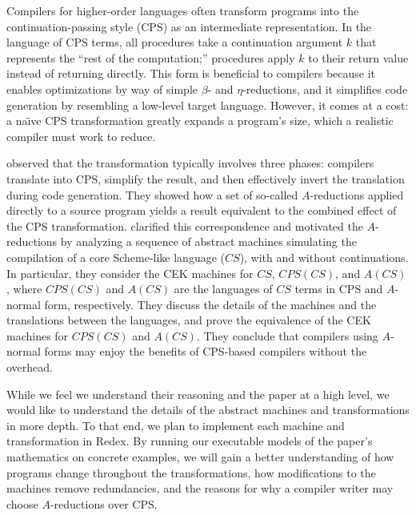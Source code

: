 \documentclass[11pt]{article}
\begin{document}
\thispagestyle{fancy}

Compilers for higher-order languages often transform programs into the
continuation-passing style (CPS) as an intermediate representation. In the
language of CPS terms, all procedures take a continuation argument $k$
that represents the ``rest of the computation;'' procedures apply $k$ to their
return value instead of returning directly. This form is beneficial to
compilers because it enables optimizations by way of simple $\beta$- and
$\eta$-reductions, and it simplifies code generation by resembling a low-level
target language. However, it comes at a cost: a na\"{\i}ve CPS transformation
greatly expands a program's size, which a realistic compiler must work to
reduce.

\citet{Sabry:1992zr} observed that the transformation typically  involves
three phases: compilers translate into CPS, simplify the result, and then
effectively invert the translation during code generation. They showed how
a set of so-called $A$-reductions applied directly to a source program yields a
result equivalent to the combined effect of the CPS transformation.
\citet{Flanagan:1993fk} clarified this correspondence and motivated the
$A$-reductions by analyzing a sequence of abstract machines simulating the
compilation of a core Scheme-like language ($\mathit{CS}$), with and without
continuations. In particular, they consider the CEK machines for $\mathit{CS}$,
$\mathit{CPS}(\mathit{CS})$, and $A(\mathit{CS})$,  where
$\mathit{CPS}(\mathit{CS})$ and $A(\mathit{CS})$ are the languages of
$\mathit{CS}$ terms in CPS and $A$-normal form, respectively.
They discuss the details of the machines and the translations between the
languages, and prove the equivalence of the CEK machines for
$\mathit{CPS}(\mathit{CS})$ and $A(\mathit{CS})$. They conclude that compilers
using $A$-normal forms may enjoy the benefits of CPS-based compilers without
the overhead.


While we feel we understand their reasoning and the paper at a high level, we
would like to understand the details of the abstract machines and
transformations in more depth. To that end, we plan to implement each
machine and transformation in Redex. By running our executable models of the
paper's mathematics on concrete examples, we will gain a better understanding
of how programs change throughout the transformations, how modifications
to the machines remove redundancies, and the reasons for why a compiler
writer may choose $A$-reductions over CPS.
\end{document}
